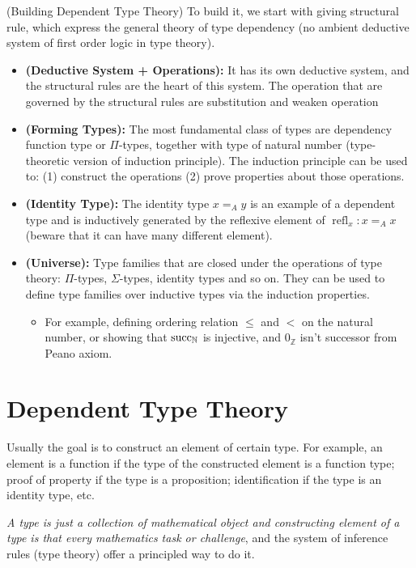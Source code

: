 \begin{remark}{(Building Dependent Type Theory)}
    To build it, we start with giving structural rule, which express the general theory of type dependency (no ambient deductive system of first order logic in type theory). 
    \begin{itemize}
        \item \textbf{(Deductive System + Operations):} It has its own deductive system, and the structural rules are the heart of this system. The operation that are governed by the structural rules are substitution and weaken operation
        \item \textbf{(Forming Types):} The most fundamental class of types are dependency function type or $\Pi$-types, together with type of natural number (type-theoretic version of induction principle). The induction principle can be used to: (1) construct the operations (2) prove properties about those operations.
        \item \textbf{(Identity Type):} The identity type $x=_Ay$ is an example of a dependent type and is inductively generated by the reflexive element of $\operatorname{refl}_x:x=_Ax$ (beware that it can have many different element).
        \item \textbf{(Universe):} Type families that are closed under the operations of type theory: $\Pi$-types, $\Sigma$-types, identity types and so on. They can be used to define type families over inductive types via the induction properties. 
        \begin{itemize}
            \item For example, defining ordering relation $\le$ and $<$ on the natural number, or showing that $\operatorname{succ}_\mathbb{N}$ is injective, and $0_\mathbb{Z}$ isn't successor from Peano axiom.
        \end{itemize}
    \end{itemize}
\end{remark}

\section{Dependent Type Theory}

Usually the goal is to construct an element of certain type. For example, an element is a function if the type of the constructed element is a function type; proof of property if the type is a proposition; identification if the type is an identity type, etc. 

\textit{A type is just a collection of mathematical object and constructing element of a type is that every mathematics task or challenge}, and the system of inference rules (type theory) offer a principled way to do it.

